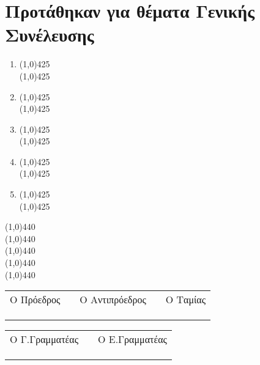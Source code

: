 \section{Προτάθηκαν για θέματα Γενικής Συνέλευσης}
\vspace{1cm}
\begin{Large}
\begin{enumerate}
 \item \line(1,0){425} \\
 \line(1,0){425} \\
 \item \line(1,0){425} \\
 \line(1,0){425} \\
  \item \line(1,0){425} \\
 \line(1,0){425} \\
  \item \line(1,0){425} \\
 \line(1,0){425} \\
  \item \line(1,0){425} \\
 \line(1,0){425} \\

\end{enumerate}
\begin{center}
\line(1,0){440} \\
\line(1,0){440} \\
\line(1,0){440} \\
\line(1,0){440} \\
\line(1,0){440} \\
\end{center}
\end{Large}


\vspace{1cm}
\begin{center}
\begin{tabular}{>{\centering\arraybackslash}p{4.5cm} c >{\centering\arraybackslash}p{4.5cm} c >{\centering\arraybackslash}p{4.5cm}}
\centering
Ο Πρόεδρος && Ο Αντιπρόεδρος && Ο Ταμίας \\
&&&& \\
&&&& \\
\cline{1-1}  \cline{3-3}  \cline{5-5} \\
\end{tabular}
\end{center}

\vspace{0.5cm}

\begin{center}
\begin{tabular}{>{\centering\arraybackslash}p{4.5cm} c >{\centering\arraybackslash}p{4.5cm}}
\centering
Ο Γ.Γραμματέας && Ο Ε.Γραμματέας\\
&& \\
&& \\
\cline{1-1}  \cline{3-3}\\
\end{tabular}
\end{center}

\vspace{0.5cm}
\newpage